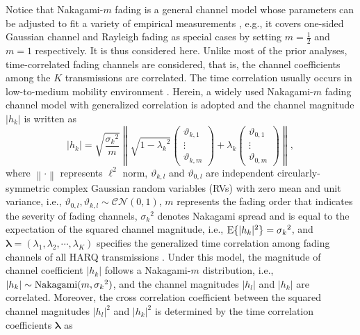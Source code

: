 \documentclass[12pt,onecolumn,draftcls]{IEEEtran}
\newcommand{\bs}{\boldsymbol}
\begin{document}


Notice that Nakagami-$m$ fading is a general channel model whose parameters can be adjusted to fit a variety of empirical measurements \cite{goldsmith2005wireless}, e.g., it covers one-sided Gaussian channel and Rayleigh fading as special cases by setting $m=\frac{1}{2}$ and $m=1$ respectively. It is thus considered here. Unlike most of the prior analyses, time-correlated fading channels are considered, that is, the channel coefficients among the $K$ transmissions are correlated. The time correlation usually occurs in low-to-medium mobility environment \cite{kim2011optimal}. Herein, a widely used Nakagami-$m$ fading channel model with generalized correlation is adopted and the channel magnitude $|h_k|$ is written as \cite{beaulieu2011novel,lopez2013bivariate,shi2012correlated}
\begin{equation}\label{eqn:R_k_def}
|{h_k}| = \sqrt {\frac{{{\sigma _k}^2}}{m}} \left\| {\sqrt {1 - {\lambda _k}^2} \left( {\begin{array}{*{20}{c}}
{{\vartheta _{k,1}}}\\
 \vdots \\
{{\vartheta _{k,m}}}
\end{array}} \right) + {\lambda _k}\left( {\begin{array}{*{20}{c}}
{{\vartheta _{0,1}}}\\
 \vdots \\
{{\vartheta _{0,m}}}
\end{array}} \right)} \right\| ,
\end{equation}
where $\left\| \cdot \right\|$ represents ${\ell }^2$ norm, ${\vartheta_{k,l}} $ and ${\vartheta_{0,l}}$ are independent circularly-symmetric complex Gaussian random variables (RVs) with zero mean and unit variance, i.e., ${\vartheta_{0,l}}, {\vartheta_{k,l}} \sim \mathcal{CN}\left( {0,1} \right)$, $m$ represents the fading order that indicates the severity of fading channels, ${\sigma_k}^2$ denotes Nakagami spread and is equal to the expectation of the squared channel magnitude, i.e., ${\rm  E}\{|h_k|^2\}={\sigma_k}^2$, and ${\boldsymbol{\lambda }} = \left( {{\lambda _1},{\lambda _2}, \cdots ,{\lambda _K}} \right)$ specifies the generalized time correlation among fading channels of all HARQ transmissions \cite{beaulieu2011novel}. Under this model, the magnitude of channel coefficient ${\left| {{h_{k}}} \right|}$ follows a Nakagami-$m$ distribution, i.e., $\left| {{h_k}} \right| \sim {\rm Nakagami}(m,{\sigma_k}^2)$, and the channel magnitudes ${\left| {{h_{l}}} \right|}$ and ${\left| {{h_{k}}} \right|}$ are correlated. Moreover, the cross correlation coefficient between the squared channel magnitudes ${\left| {{h_{l}}} \right|^2}$ and ${\left| {{h_{k}}} \right|^2}$ is determined by the time correlation coefficients $\bs \lambda$ as \cite{beaulieu2011novel}
\end{document}
